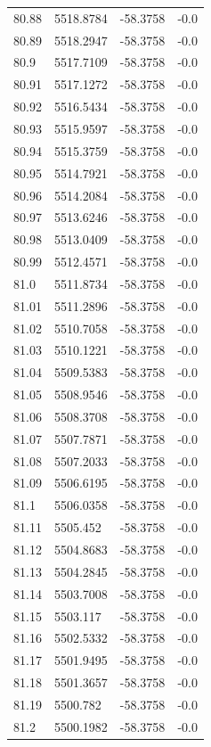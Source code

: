 \begin{table}[H]
\begin{tabular}{llll}
80.88 & 5518.8784 & -58.3758 & -0.0 \\
80.89 & 5518.2947 & -58.3758 & -0.0 \\
80.9 & 5517.7109 & -58.3758 & -0.0 \\
80.91 & 5517.1272 & -58.3758 & -0.0 \\
80.92 & 5516.5434 & -58.3758 & -0.0 \\
80.93 & 5515.9597 & -58.3758 & -0.0 \\
80.94 & 5515.3759 & -58.3758 & -0.0 \\
80.95 & 5514.7921 & -58.3758 & -0.0 \\
80.96 & 5514.2084 & -58.3758 & -0.0 \\
80.97 & 5513.6246 & -58.3758 & -0.0 \\
80.98 & 5513.0409 & -58.3758 & -0.0 \\
80.99 & 5512.4571 & -58.3758 & -0.0 \\
81.0 & 5511.8734 & -58.3758 & -0.0 \\
81.01 & 5511.2896 & -58.3758 & -0.0 \\
81.02 & 5510.7058 & -58.3758 & -0.0 \\
81.03 & 5510.1221 & -58.3758 & -0.0 \\
81.04 & 5509.5383 & -58.3758 & -0.0 \\
81.05 & 5508.9546 & -58.3758 & -0.0 \\
81.06 & 5508.3708 & -58.3758 & -0.0 \\
81.07 & 5507.7871 & -58.3758 & -0.0 \\
81.08 & 5507.2033 & -58.3758 & -0.0 \\
81.09 & 5506.6195 & -58.3758 & -0.0 \\
81.1 & 5506.0358 & -58.3758 & -0.0 \\
81.11 & 5505.452 & -58.3758 & -0.0 \\
81.12 & 5504.8683 & -58.3758 & -0.0 \\
81.13 & 5504.2845 & -58.3758 & -0.0 \\
81.14 & 5503.7008 & -58.3758 & -0.0 \\
81.15 & 5503.117 & -58.3758 & -0.0 \\
81.16 & 5502.5332 & -58.3758 & -0.0 \\
81.17 & 5501.9495 & -58.3758 & -0.0 \\
81.18 & 5501.3657 & -58.3758 & -0.0 \\
81.19 & 5500.782 & -58.3758 & -0.0 \\
81.2 & 5500.1982 & -58.3758 & -0.0 \\

\end{tabular}
\end{table}

